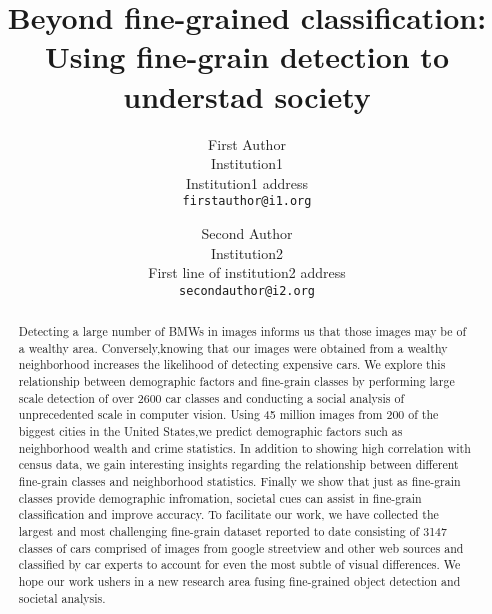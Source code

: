\documentclass[10pt,twocolumn,letterpaper]{article}
\begin{document}
\title{Beyond fine-grained classification: Using fine-grain detection to understad society}

\author{First Author\\
Institution1\\
Institution1 address\\
{\tt\small firstauthor@i1.org}
\and
Second Author\\
Institution2\\
First line of institution2 address\\
{\tt\small secondauthor@i2.org}
}

\maketitle

\begin{abstract}
Detecting a large number of BMWs in images informs us that those images may be of a wealthy area. Conversely,knowing that our images were obtained from a wealthy neighborhood increases the likelihood of detecting expensive cars. We explore this relationship between demographic factors and fine-grain classes by performing large scale detection of over 2600 car classes and conducting a social analysis of unprecedented scale in computer vision. Using 45 million images from 200 of the biggest cities in the United States,we predict demographic factors such as neighborhood wealth and crime statistics. In addition to showing high correlation with census data, we gain interesting insights regarding the relationship between different fine-grain classes and neighborhood statistics. Finally we show that just as fine-grain classes provide demographic infromation, societal cues can assist in fine-grain classification and improve accuracy. To facilitate our work, we have collected the largest and most challenging fine-grain dataset reported to date consisting of 3147 classes of cars comprised of images from google streetview and other web sources and classified by car experts to account for even the most subtle of visual differences. We hope our work ushers in a new research area fusing fine-grained object detection and societal analysis.
\end{abstract}
\end{document}
